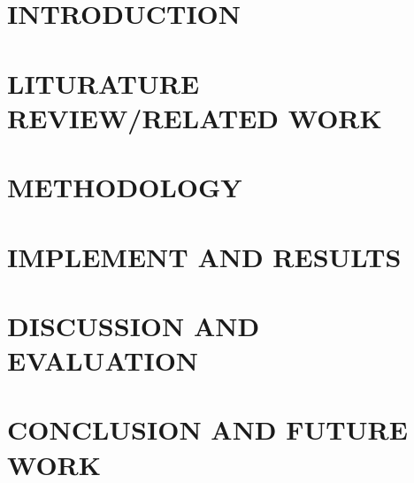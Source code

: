 \documentclass[12pt, twoside]{report}
\begin{document}
\chapter{INTRODUCTION}
\setcounter{page}{1}


\chapter{LITURATURE REVIEW/RELATED WORK}


\chapter{METHODOLOGY}


\chapter{IMPLEMENT AND RESULTS}


\chapter{DISCUSSION AND EVALUATION}

	
\chapter{CONCLUSION AND FUTURE WORK}




\end{document}
